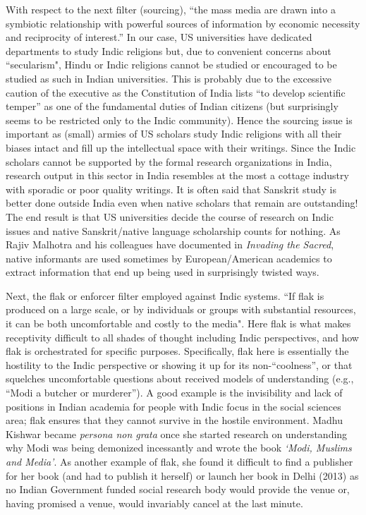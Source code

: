 With respect to the next filter (sourcing), ``the mass media are drawn into a symbiotic relationship with powerful sources of information by economic necessity and reciprocity of interest.” In our case, US universities have dedicated departments to study Indic religions but, due to convenient concerns about ``secularism", Hindu or Indic religions cannot be studied or encouraged to be studied as such in Indian universities. This is probably due to the excessive caution of the executive as the Constitution of India lists “to develop scientific temper” as one of the fundamental duties of Indian citizens (but surprisingly seems to be restricted only to the Indic community). Hence the sourcing issue is important as (small) armies of US scholars study Indic religions with all their biases intact and fill up the intellectual space with their writings. Since the Indic scholars cannot be supported by the formal research organizations in India, research output in this sector in India resembles at the most a cottage industry with sporadic or poor quality writings. It is often said that Sanskrit study is better done outside India even when native scholars that remain are outstanding! The end result is that US universities decide the course of research on Indic issues and native Sanskrit/native language scholarship counts for nothing. As Rajiv Malhotra and his colleagues have documented in {\sl Invading the Sacred}, native informants are used sometimes by European/American academics to extract information that end up being used in surprisingly twisted ways.

Next, the flak or enforcer filter employed against Indic systems. ``If flak is produced on a large scale, or by individuals or groups with substantial resources, it can be both uncomfortable and costly to the media". Here flak is what makes receptivity difficult to all shades of thought including Indic perspectives, and how flak is orchestrated for specific purposes. Specifically, flak here is essentially the hostility to the Indic perspective or showing it up for its non-“coolness”, or that squelches uncomfortable questions about received models of understanding (e.g., ``Modi a butcher or murderer”). A good example is the invisibility and lack of positions in Indian academia for people with Indic focus in the social sciences area; flak ensures that they cannot survive in the hostile environment. Madhu Kishwar became {\sl persona non grata} once she started research on understanding why Modi was being demonized incessantly and wrote the book {\sl `Modi, Muslims and Media'}. As another example of flak, she found it difficult to find a publisher for her book (and had to publish it herself) or launch her book in Delhi (2013) as no Indian Government funded social research body would provide the venue or, having promised a venue, would invariably cancel at the last minute.

